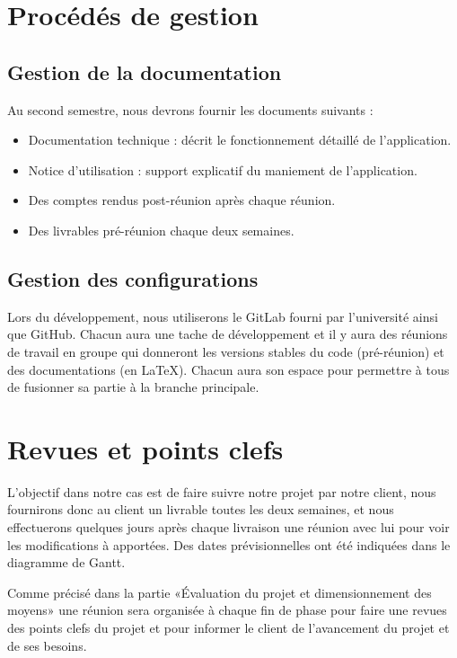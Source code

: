 \chapter{Procédés de gestion}

\section{Gestion de la documentation}
Au second semestre, nous devrons fournir les documents suivants :

\begin{itemize}
    \item Documentation technique : décrit le fonctionnement détaillé de l’application.
    \item Notice d’utilisation : support explicatif du maniement de l’application.
    \item Des comptes rendus post-réunion après chaque réunion.
    \item Des livrables pré-réunion chaque deux semaines.\\ \newline
\end{itemize}

\section{Gestion des configurations}
Lors du développement, nous utiliserons le GitLab fourni par l’université ainsi que GitHub. Chacun
aura une tache de développement et il y aura des réunions de travail en groupe qui donneront les
versions stables du code (pré-réunion) et des documentations (en \LaTeX). Chacun aura son espace
pour permettre à tous de fusionner sa partie à la branche principale.


\chapter{Revues et points clefs}

L'objectif dans notre cas est de faire suivre notre projet par notre client,
nous fournirons donc au client un livrable toutes les deux semaines, et nous effectuerons
quelques jours après chaque livraison une réunion avec lui pour voir les modifications à
apportées. Des dates prévisionnelles ont été indiquées dans le diagramme de Gantt.\newline

Comme précisé dans la partie «Évaluation du projet et dimensionnement des moyens» une réunion sera
organisée à chaque fin de phase pour faire une revues des points clefs du projet et pour informer
le client de l'avancement du projet et de ses besoins.

